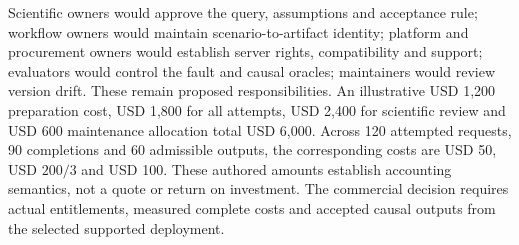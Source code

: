 Scientific owners would approve the query, assumptions and acceptance rule;
workflow owners would maintain scenario-to-artifact identity; platform and
procurement owners would establish server rights, compatibility and support;
evaluators would control the fault and causal oracles; maintainers would
review version drift. These remain proposed responsibilities. An illustrative
USD 1,200 preparation cost, USD 1,800 for all attempts, USD 2,400 for scientific
review and USD 600 maintenance allocation total USD 6,000. Across 120 attempted
requests, 90 completions and 60 admissible outputs, the corresponding costs
are USD 50, USD $200/3$ and USD 100. These authored amounts establish accounting
semantics, not a quote or return on investment. The commercial decision requires
actual entitlements, measured complete costs and accepted causal outputs from
the selected supported deployment.~\citep{exec25_dataiku_choice}
